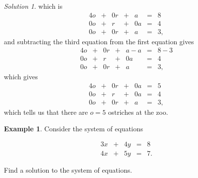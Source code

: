 \documentclass[
]{book}
\theoremstyle{definition}
\theoremstyle{definition}
\newtheorem{example}{Example}[chapter]
\theoremstyle{definition}
\theoremstyle{definition}
\theoremstyle{remark}
\newtheorem*{solution}{Solution}
\begin{document}
\begin{solution}
which is
\begin{alignat*}{4}
o   & {}+{} &  0r  & {}+{} & a  & {}={} & 8 \\
0o  & {}+{} &  r & {}+{} & 0a & {}={} & 4 \\
0o  & {}+{} &  0r  & {}+{} & a & {}={} & 3, 
\end{alignat*}
and subtracting the third equation from the first equation gives
\begin{alignat*}{4}
o   & {}+{} &  0r  & {}+{} & a - a  & {}={} & 8 - 3 \\
0o  & {}+{} &  r & {}+{} & 0a & {}={} & 4 \\
0o  & {}+{} &  0r  & {}+{} & a & {}={} & 3, 
\end{alignat*}
which gives
\begin{alignat*}{4}
o   & {}+{} &  0r  & {}+{} & 0a  & {}={} & 5 \\
0o  & {}+{} &  r & {}+{} & 0a & {}={} & 4 \\
0o  & {}+{} &  0r  & {}+{} & a & {}={} & 3, 
\end{alignat*}
which tells us that there are \(o=5\) ostriches at the zoo.
\end{solution}

\begin{example}
\protect\hypertarget{exm:example-one-solution}{}\label{exm:example-one-solution}Consider the system of equations

\begin{alignat*}{3}
x   & {}+{} & 4 y & {}={} & 8 \\
4 x & {}+{} & 5 y & {}={} & 7.
\end{alignat*}

Find a solution to the system of equations.
\end{example}
\end{document}
